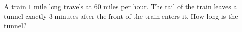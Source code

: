 A train $1$ mile long travels at $60$ miles per hour. The tail of the train leaves a tunnel exactly $3$ minutes after the front of the train enters it. How long is the tunnel?
